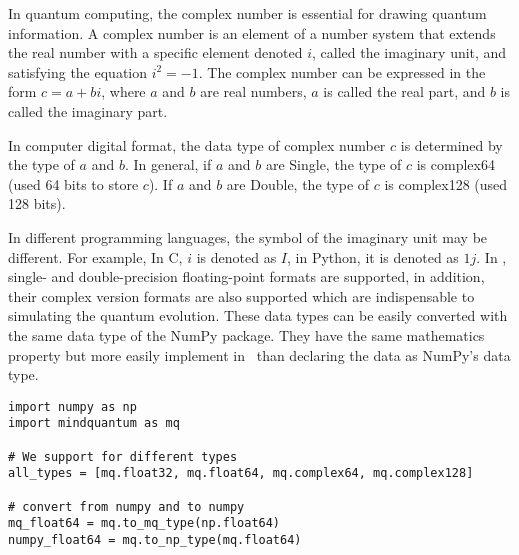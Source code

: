 

In quantum computing, the complex number is essential for drawing quantum information. A complex number is an element of a number system that extends the real number with a specific element denoted $i$, called the imaginary unit, and satisfying the equation $i^2=-1$.
The complex number can be expressed in the form $c=a+bi$, where $a$ and $b$ are real numbers, $a$ is called the real part, and $b$ is called the imaginary part.

In computer digital format, the data type of complex number $c$ is determined by the type of $a$ and $b$.
In general, if $a$ and $b$ are Single, the type of $c$ is complex64 (used 64 bits to store $c$). If $a$ and $b$ are Double, the type of $c$ is complex128 (used 128 bits).

In different programming languages, the symbol of the imaginary unit may be different.
For example, In C, $i$ is denoted as $I$, in Python, it is denoted as $1j$.
In \MindQuantum, single- and double-precision floating-point formats are supported, in addition, their complex version formats are also supported which are indispensable to simulating the quantum evolution.
These data types can be easily converted with the same data type of the NumPy \cite{harris2020array} package. They have the same mathematics property but more easily implement in \MindQuantum\ than declaring the data as NumPy's data type.

\begin{lstlisting}
import numpy as np
import mindquantum as mq

# We support for different types
all_types = [mq.float32, mq.float64, mq.complex64, mq.complex128]

# convert from numpy and to numpy
mq_float64 = mq.to_mq_type(np.float64)
numpy_float64 = mq.to_np_type(mq.float64)
\end{lstlisting}

